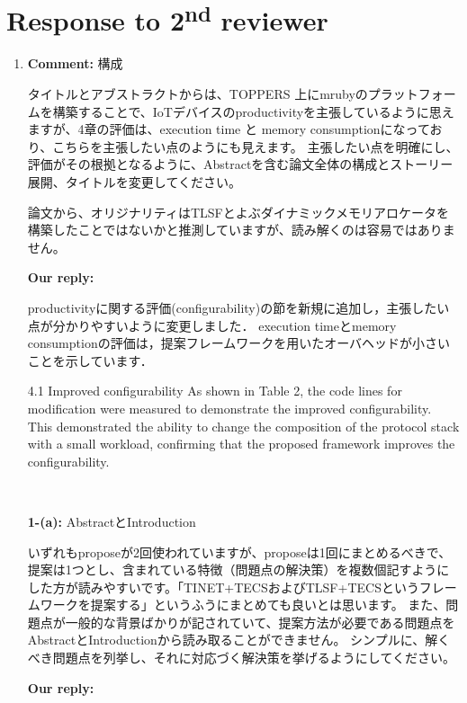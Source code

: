\documentclass{article}
\newcommand\nd{\textsuperscript{nd}\xspace}
\begin{document}
\clearpage

\section{Response to 2\nd reviewer}

\begin{enumerate}

\item \begin{flushleft}
\textbf{Comment:} 構成

タイトルとアブストラクトからは、TOPPERS 上にmrubyのプラットフォームを構築することで、IoTデバイスのproductivityを主張しているように思えますが、4章の評価は、execution time と memory consumptionになっており、こちらを主張したい点のようにも見えます。
主張したい点を明確にし、評価がその根拠となるように、Abstractを含む論文全体の構成とストーリー展開、タイトルを変更してください。

論文から、オリジナリティはTLSFとよぶダイナミックメモリアロケータを構築したことではないかと推測していますが、読み解くのは容易ではありません。
\end{flushleft}
\begin{flushleft}
\textbf{Our reply:}

productivityに関する評価(configurability)の節を新規に追加し，主張したい点が分かりやすいように変更しました．
execution timeとmemory consumptionの評価は，提案フレームワークを用いたオーバヘッドが小さいことを示しています．

\begin{itembox}[|]{4.1 Improved configurability}
As shown in Table 2, the code lines for modification were measured to demonstrate the improved configurability.
This demonstrated the ability to change the composition of the protocol stack with a small workload, confirming that the proposed framework improves the configurability.
\end{itembox}\\

\end{flushleft}

\begin{flushleft}
\textbf{1-(a):} AbstractとIntroduction

いずれもproposeが2回使われていますが、proposeは1回にまとめるべきで、提案は1つとし、含まれている特徴（問題点の解決策）を複数個記すようにした方が読みやすいです。「TINET+TECSおよびTLSF+TECSというフレームワークを提案する」というふうにまとめても良いとは思います。
また、問題点が一般的な背景ばかりが記されていて、提案方法が必要である問題点をAbstractとIntroductionから読み取ることができません。
シンプルに、解くべき問題点を列挙し、それに対応づく解決策を挙げるようにしてください。
\end{flushleft}
\begin{flushleft}
\textbf{Our reply:}


\end{flushleft}
\end{enumerate}
\end{document}
